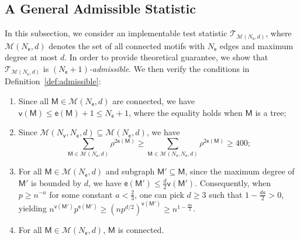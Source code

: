 \documentclass[letterpaper,11pt]{article}
\theoremstyle{definition}
\newcommand{\maM}{\mathcal{M}}
\newcommand{\maT}{\mathcal{T}}
\newcommand{\en}{\mathsf{{e}}}
\newcommand{\vn}{\mathsf{{v}}}
\newcommand{\sfM}{{\mathsf{M}}}
\newcommand{\sfe}{{\mathsf{e}}}
\newcommand{\sfv}{{\mathsf{v}}}
\begin{document}
\subsection{A General Admissible Statistic}\label{subsec:general-bd-degree}
In this subsection, we consider an implementable test statistic $\maT_{\maM(N_\sfe,d)}$, where $\maM(N_\sfe,d)$ denotes the set of all connected motifs with $N_\sfe$ edges and maximum degree at most $d$. In order to provide theoretical guarantee, we show that $\maT_{\maM(N_\sfe,d)}$ is  \emph{$(N_\sfe{+}1)$-admissible}. We then verify the conditions in Definition~\ref{def:admissible}:\begin{enumerate}
    \item Since all $\sfM\in \maM(N_\sfe,d)$ are connected, we have  $\vn(\sfM)\le \en(\sfM)+1\le N_\sfe+1$, where the equality holds when $\sfM$ is a tree;
    \item Since $\maM(N_\sfv,N_\sfe,d)\subseteq \maM(N_\sfe,d)$, we have $$\sum_{\sfM\in \maM(N_\sfe,d)} \rho^{2\en(\sfM)}\ge \sum_{\sfM\in \maM(N_\sfv,N_\sfe,d)} \rho^{2\en(\sfM)}\ge 400;$$
    \item For all $\sfM\in\maM(N_\sfe,d)$ and subgraph $\sfM'\subseteq \sfM$, since the maximum degree of $\sfM'$ is bounded by $d$, we have $\en(\sfM')\le \frac{d}{2}\vn(\sfM')$. Consequently, when $p\ge n^{-a}$ for some constant $a<\frac{2}{3}$, one can pick $d\ge 3$  such that $1-\frac{da}{2}>0$, yielding $n^{\vn(\sfM')} p^{\en(\sfM')}\ge (np^{d/2})^{\vn(\sfM')}\ge n^{1-\frac{da}{2}}$.
    \item For all $\sfM\in \maM(N_\sfe,d)$, $\sfM$ is connected.
\end{enumerate}
\end{document}
